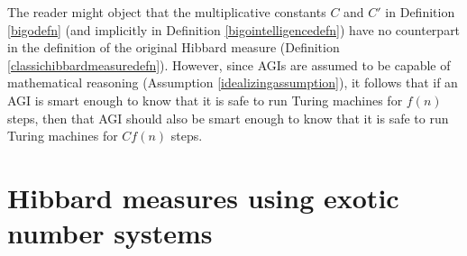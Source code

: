 \documentclass{article}
\begin{document}
The reader might object that the multiplicative constants $C$ and $C'$ in
Definition \ref{bigodefn} (and implicitly in Definition \ref{bigointelligencedefn})
have no counterpart in the definition of the original Hibbard measure
(Definition \ref{classichibbardmeasuredefn}). However, since AGIs are assumed to
be capable of mathematical reasoning (Assumption \ref{idealizingassumption}), it
follows that if an AGI is smart enough to know that it is safe to run Turing
machines for $f(n)$ steps, then that AGI should also be smart enough to know that
it is safe to run Turing machines for $Cf(n)$ steps.

\section{Hibbard measures using exotic number systems}
\label{exoticsection}
\end{document}
